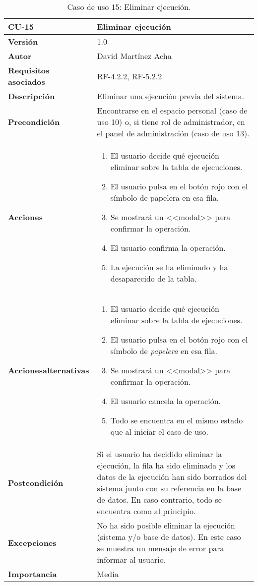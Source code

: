 \begin{table}[p]
	\centering
	\begin{tabularx}{\linewidth}{ p{} p{} }
		\toprule
		\textbf{CU-15}    & \textbf{Eliminar ejecución}\\
		\toprule
		\textbf{Versión}              & 1.0    \\
		\textbf{Autor}                & David Martínez Acha \\
		\textbf{Requisitos asociados} & RF-4.2.2, RF-5.2.2 \\
		\textbf{Descripción}          & Eliminar una ejecución previa del sistema. \\
		\textbf{Precondición}         & Encontrarse en el espacio personal (caso de uso 10) o, si tiene rol de administrador, en el panel de administración (caso de uso 13). \\
		\textbf{Acciones}             &
		\begin{enumerate}
			\def\labelenumi{\arabic{enumi}.}
			\tightlist
			\item El usuario decide qué ejecución eliminar sobre la tabla de ejecuciones.
			\item El usuario pulsa en el botón rojo con el símbolo de papelera en esa fila.
			\item Se mostrará un <<modal>> para confirmar la operación.
			\item El usuario confirma la operación.
			\item La ejecución se ha eliminado y ha desaparecido de la tabla.
		\end{enumerate}\\
		\textbf{Acciones\newline alternativas}&
		\begin{enumerate}
			\def\labelenumi{\arabic{enumi}.}
			\tightlist
			\item El usuario decide qué ejecución eliminar sobre la tabla de ejecuciones.
			\item El usuario pulsa en el botón rojo con el símbolo de \textit{papelera} en esa fila.
			\item Se mostrará un <<modal>> para confirmar la operación.
			\item El usuario cancela la operación.
			\item Todo se encuentra en el mismo estado que al iniciar el caso de uso.
		\end{enumerate}\\
		\textbf{Postcondición}        & Si el usuario ha decidido eliminar la ejecución, la fila ha sido eliminada y los datos de la ejecución han sido borrados del sistema junto con su referencia en la base de datos. 
		En caso contrario, todo se encuentra como al principio.\\
		\textbf{Excepciones}          & No ha sido posible eliminar la ejecución (sistema y/o base de datos). En este caso se muestra un mensaje de error para informar al usuario. \\
		\textbf{Importancia}          & Media \\
		\bottomrule
	\end{tabularx}
	\caption{Caso de uso 15: Eliminar ejecución.}
\end{table}

